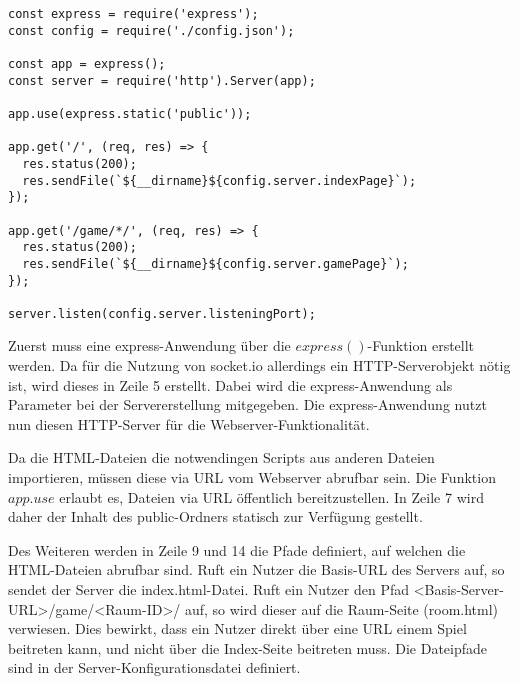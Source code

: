 \vspace{11pt}
\lstset{language=js, style=STYLE_CODE_JS}
\begin{minipage}{\textwidth}
\begin{singlespace}
\begin{lstlisting}[caption={express Server -- Server.js}, captionpos=b, label={lst:express}]
const express = require('express');
const config = require('./config.json');

const app = express();
const server = require('http').Server(app);

app.use(express.static('public'));

app.get('/', (req, res) => {
  res.status(200);
  res.sendFile(`${__dirname}${config.server.indexPage}`);
});

app.get('/game/*/', (req, res) => {
  res.status(200);
  res.sendFile(`${__dirname}${config.server.gamePage}`);
});

server.listen(config.server.listeningPort);
\end{lstlisting}
\end{singlespace}
\end{minipage}

Zuerst muss eine express-Anwendung über die $express()$-Funktion erstellt werden. Da für die Nutzung von socket.io allerdings ein \acs{HTTP}-Serverobjekt nötig ist, wird dieses in Zeile 5 erstellt. Dabei wird die express-Anwendung als Parameter bei der Servererstellung mitgegeben. Die express-Anwendung nutzt nun diesen \acs{HTTP}-Server für die Webserver-Funktionalität.\par

Da die \acs{HTML}-Dateien die notwendingen Scripts aus anderen Dateien importieren, müssen diese via \acs{URL} vom Webserver abrufbar sein. Die Funktion $app.use$ erlaubt es, Dateien via \acs{URL} öffentlich bereitzustellen. In Zeile 7 wird daher der Inhalt des \glqq{}public\grqq{}-Ordners statisch zur Verfügung gestellt.\par

Des Weiteren werden in Zeile 9 und 14 die Pfade definiert, auf welchen die \acs{HTML}-Dateien abrufbar sind. Ruft ein Nutzer die Basis-\acs{URL} des Servers auf, so sendet der Server die \glqq{}index.html\grqq{}-Datei. Ruft ein Nutzer den Pfad \grqq{}<Basis-Server-URL>/game/<Raum-ID>/\grqq{} auf, so wird dieser auf die Raum-Seite (\glqq{}room.html\grqq{}) verwiesen. Dies bewirkt, dass ein Nutzer direkt über eine \acs{URL} einem Spiel beitreten kann, und nicht über die Index-Seite beitreten muss. Die Dateipfade sind in der Server-Konfigurationsdatei definiert.

